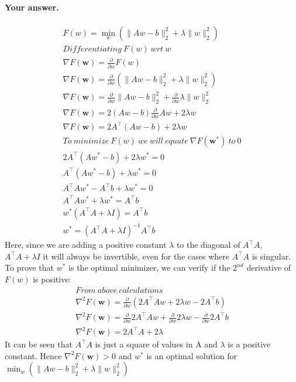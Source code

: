 \documentclass[11pt]{scrartcl}
\newcommand{\bw}{\mathbf{w}}
\begin{document}
	\paragraph{Your answer.}
	\begin{gather*}
	F(w) = \min_w(\|Aw-b\|_2^2 + \lambda\|w\|_2^2)\\
	Differentiating\ F(w)\ wrt\ w\\
	\nabla F(\bw) = \frac{\partial }{\partial w}F(w)\\
	\nabla F(\bw) = \frac{\partial }{\partial w}(\|Aw-b\|_2^2 + \lambda\|w\|_2^2)\\
	\nabla F(\bw) = \frac{\partial }{\partial w}\|Aw-b\|_2^2 + \frac{\partial }{\partial w}\lambda\|w\|_2^2\\
	\nabla F(\bw) = 2(Aw-b) \frac{\partial }{\partial w}Aw + 2\lambda w\\
	\nabla F(\bw) = 2A^\intercal(Aw-b) + 2\lambda w\\
	To\ minimize\ F(w)\ we\ will\ equate\ \nabla F(\bw^*)\ to\ 0\\
	2A^\intercal(Aw^*-b) + 2\lambda w^* = 0\\
	A^\intercal(Aw^*-b) + \lambda w^* = 0\\
	A^\intercal Aw^*- A^\intercal b + \lambda w^* = 0\\
	A^\intercal Aw^* + \lambda w^* = A^\intercal b \\
	w^*(A^\intercal A + \lambda I)= A^\intercal b \\
	w^*= (A^\intercal A + \lambda I)^{-1}A^\intercal b
	\end{gather*}
	Here, since we are adding a positive constant $\lambda$ to the diagonal of $A^\intercal A$, $A^\intercal A + \lambda I$ it will always be invertible, even for the cases where $A^\intercal A$ is singular.\\
	To prove that $w^*$ is the optimal minimizer, we can verify if the $2^{nd}$ derivative of $F(w)$ is positive:
	\begin{gather*}
	From\ above\ calculations\\
	\nabla^2 F(\bw) =  \frac{\partial }{\partial w}(2A^\intercal Aw + 2\lambda w - 2A^\intercal b)\\
	\nabla^2 F(\bw) =  \frac{\partial }{\partial w}2A^\intercal Aw + \frac{\partial }{\partial w}2\lambda w - \frac{\partial }{\partial w}2A^\intercal b\\
	\nabla^2 F(\bw) =  2A^\intercal A + 2\lambda
	\end{gather*}
	It can be seen that $A^\intercal A$ is just a square of values in A and $\lambda$ is a positive constant. Hence $\nabla^2 F(\bw) > 0$ and $w^*$ is an optimal solution for $\min_w(\|Aw-b\|_2^2 + \lambda\|w\|_2^2)$
	
\end{document}
